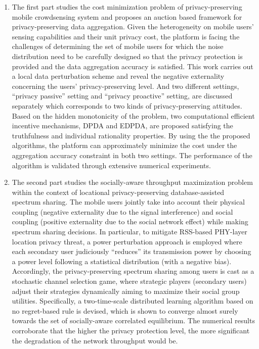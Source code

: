 \begin{englishabstract}
\begin{enumerate}
    		\item The first part studies the cost minimization problem of privacy-preserving mobile crowdsensing system and proposes an auction based framework for privacy-preserving data aggregation. Given the heterogeneity on mobile users' sensing capabilities and their unit privacy cost, the platform is facing the challenges of determining the set of mobile users for which the noise distribution need to be carefully designed so that the privacy protection is provided and the data aggregation accuracy is satisfied. This work carries out a local data perturbation scheme and reveal the negative externality concerning the users' privacy-preserving level. And two different settings, ``privacy passive'' setting and ``privacy proactive'' setting, are discussed separately which corresponds to two kinds of privacy-preserving attitudes. Based on the hidden monotonicity of the problem, two computational efficient incentive mechanisms, DPDA and EDPDA, are proposed satisfying the truthfulness and individual rationality properties. By using the the proposed algorithms, the platform can approximately minimize the cost under the aggregation accuracy constraint in both two settings. The performance of the algorithm is validated through extensive numerical experiments.
    		\item The second part studies the socially-aware throughput maximization problem within the context of locational privacy-preserving database-assisted spectrum sharing. The mobile users jointly take into account their physical coupling (negative externality due to the signal interference) and social coupling (positive externality due to the social network effect) while making spectrum sharing decisions. In particular, to mitigate RSS-based PHY-layer location privacy threat, a power perturbation approach is employed where each secondary user judiciously ``reduces'' its transmission power by choosing a power level following a statistical distribution (with a negative bias). Accordingly, the privacy-preserving spectrum sharing among users is cast as a stochastic channel selection game, where strategic players (secondary users) adjust their strategies dynamically aiming to maximize their social group utilities. Specifically, a two-time-scale distributed learning algorithm based on no regret-based rule is devised, which is shown to converge almost surely towards the set of socially-aware correlated equilibrium. The numerical results corroborate that the higher the privacy protection level, the more significant the degradation of the network throughput would be.

\end{enumerate}
\end{englishabstract}

